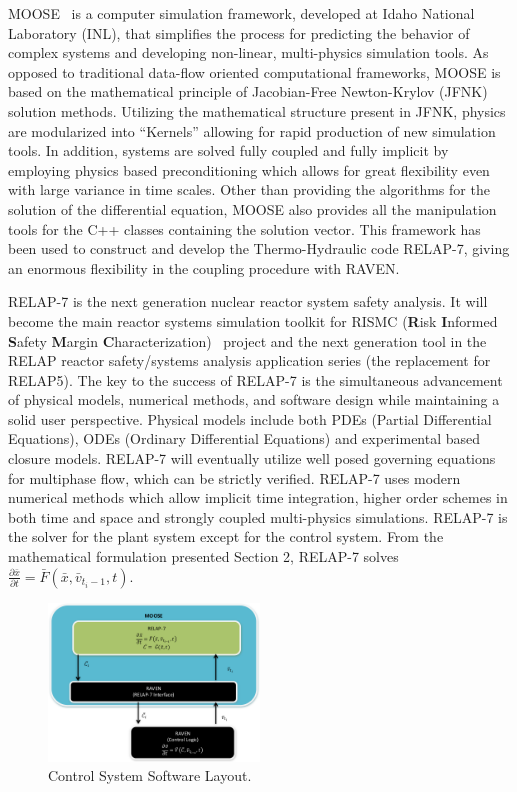 \documentclass{mc2013}
\begin{document}
\label{sec:MOOSE/RELAP-7}
MOOSE~\cite{MOOSE} is a computer simulation framework,  developed at Idaho National Laboratory (INL), that simplifies the process for predicting the behavior of complex systems and developing non-linear, multi-physics simulation tools. As opposed to traditional data-flow oriented computational frameworks, MOOSE is based on the mathematical principle of Jacobian-Free Newton-Krylov (JFNK) solution methods. Utilizing the mathematical structure present in JFNK, physics are modularized into “Kernels” allowing for rapid production of new simulation tools. In addition, systems are solved fully coupled and fully implicit by employing physics based preconditioning which allows for great flexibility even with large variance in time scales. 
Other than providing the algorithms for the solution of the differential equation, MOOSE also provides all the manipulation tools for the C++ classes containing the solution vector. This framework has been used to construct and develop the Thermo-Hydraulic code RELAP-7, giving an enormous flexibility in the coupling procedure with RAVEN.

RELAP-7 is the next generation nuclear reactor system safety analysis. It will become the main reactor systems simulation toolkit for RISMC (\textbf{R}isk \textbf{I}nformed \textbf{S}afety \textbf{M}argin \textbf{C}haracterization)~\cite{mandelliANS_RISMC} project and the next generation tool in the RELAP reactor safety/systems analysis application series (the replacement for RELAP5). The key to the success of RELAP-7 is the simultaneous advancement of physical models, numerical methods, and software design while maintaining a solid user perspective. 
Physical models include both PDEs (Partial Differential Equations), ODEs (Ordinary Differential Equations) and experimental based closure models. RELAP-7 will eventually utilize well posed governing equations for multiphase flow, which can be strictly verified. RELAP-7 uses modern numerical methods which allow implicit time integration, higher order schemes in both time and space and strongly coupled multi-physics simulations.
RELAP-7 is the solver for the plant system except for the control system. From the mathematical
formulation presented Section 2, RELAP-7 solves 
$\frac{\partial \bar{x}}{\partial t} = \bar{F}(\bar{x},\bar{v}_{t_{i}-1},t)$.
\begin{figure}[h] 
  \centering
     \includegraphics[width=0.5\textwidth]{figures/ControlSystemSoftwareLayout.pdf}
  \caption{Control System Software Layout.}
   \label{fig:ControlSoftwareLayout}
\end{figure}
\end{document}
